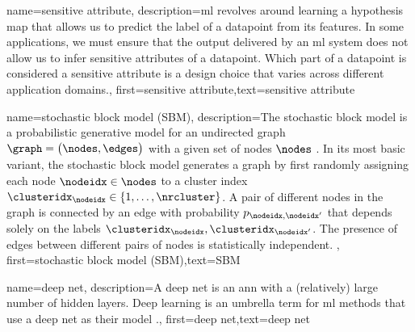 {{
{name={sensitive attribute},
	description={\gls{ml} revolves around learning a \gls{hypothesis} map that allows 
		us to predict the \gls{label} of a \gls{datapoint} from its \gls{feature}s. In some 
		applications, we must ensure that the output delivered by an \gls{ml} system does 
		not allow us to infer sensitive attributes of a \gls{datapoint}. Which part 
		of a \gls{datapoint} is considered a sensitive attribute is a design 
		choice that varies across different application domains.},
	first={sensitive attribute},text={sensitive attribute} 
}


{name={stochastic block model (SBM)},
	description={The stochastic block \gls{model} is a 
		probabilistic generative \gls{model} for an undirected \gls{graph} $\graph = \big( \nodes, \edges \big)$ 
		with a given set of nodes $\nodes$ \cite{AbbeSBM2018}. In its most basic variant, 
		the stochastic block \gls{model} generates a \gls{graph} by first randomly assigning each node $\nodeidx \in \nodes$ to 
		a \gls{cluster} index $\clusteridx_{\nodeidx} \in \{1,\ldots,\nrcluster\}$. A pair of different nodes in the 
		\gls{graph} is connected by an edge with \gls{probability} $p_{\nodeidx,\nodeidx'}$ that depends 
		solely on the \gls{label}s $\clusteridx_{\nodeidx}, \clusteridx_{\nodeidx'}$. 
		The presence of edges between different pairs of 
		nodes is statistically independent. },
	first={stochastic block model (SBM)},text={SBM} 
}

{name={deep net},
	description={A deep net is an \gls{ann} with a (relatively) large number of 
	hidden layers. Deep learning is an umbrella term for \gls{ml} methods that use a deep 
	net as their \gls{model} \cite{Goodfellow-et-al-2016}.},
	first={deep net},text={deep net} 
}

\newcommand{\gaussiancenter}{3}

}}
